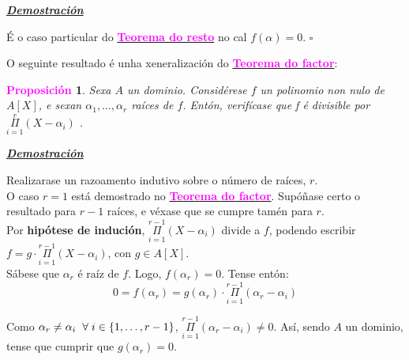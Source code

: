 \documentclass[twoside]{report}
\newcommand{\magbf}[1]{\textcolor{magenta}{\textbf{#1}}} %
\theoremstyle{mystyle}
\newtheorem{prop}{\magbf{Proposición}}[chapter]
\newenvironment{proposition}
{\begin{mdframed}[linecolor = magenta,backgroundcolor = classicrose, linewidth = 2mm]\begin{prop}}
{\end{prop}\end{mdframed}}
\begin{document}
\vspace{2mm}

\noindent \textbf{\textit{\underline{Demostración}}}

\vspace{2mm}

\noindent É o caso particular do \hyperref[th2.10]{\magbf{Teorema do resto}} no cal $f(\alpha) = 0$. $\square$\\

\vspace{3mm}

\noindent O seguinte resultado é unha xeneralización do \hyperref[cor2.6]{\magbf{Teorema do factor}}:\\

\begin{proposition} \label{prop2.20}
Sexa $A$ un dominio. Considérese $f$ un polinomio non nulo de $A[X]$, e sexan $\alpha_{1}, \ldots, \alpha_{r}$ raíces de $f$. Entón, verifícase que f é divisible por $\overset{r}{\underset{i = 1}{\Pi}}{(X - \alpha_{i})}$ .
\end{proposition}

\vspace{2mm}

\noindent \textbf{\textit{\underline{Demostración}}}

\vspace{2mm}

\noindent Realizarase un razoamento indutivo sobre o número de raíces, $r$.\\

\noindent O caso $r = 1$ está demostrado no \hyperref[cor2.6]{\magbf{Teorema do factor}}. Supóñase certo o resultado para $r-1$ raíces, e véxase que se cumpre tamén para $r$.\\

\noindent Por \textbf{hipótese de indución}, $\overset{r-1}{\underset{i = 1}{\Pi}}(X-\alpha_{i})$ divide a $f$, podendo escribir $f = g \cdot \overset{r-1}{\underset{i = 1}{\Pi}}(X-\alpha_{i})$, con $g \in A[X]$.\\

\noindent Sábese que $\alpha_{r}$ é raíz de $f$. Logo, $f(\alpha_{r}) = 0$. Tense entón:
$$0 = f(\alpha_{r}) = g(\alpha_{r}) \cdot \overset{r-1}{\underset{i = 1}{\Pi}}(\alpha_{r}-\alpha_{i})$$

\noindent Como $\alpha_{r} \neq \alpha_{i} \hspace{2mm} \forall \hspace{1mm} i \in \{1, \ldots, r-1\}$, $\overset{r-1}{\underset{i = 1}{\Pi}}(\alpha_{r}-\alpha_{i}) \neq 0$. Así, sendo $A$ un dominio, tense que cumprir que $g(\alpha_{r}) = 0$.\\
\end{document}
